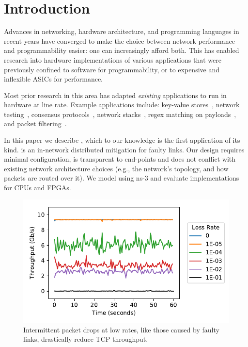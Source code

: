 \section{Introduction}
Advances in networking, hardware architecture, and programming
languages in recent years have converged to make the choice between
network performance and programmability easier: one can increasingly
afford both.
This has enabled research into hardware implementations of various
applications that were previously confined to software for
programmability, or to expensive and inflexible ASICs for performance.

Most prior research in this area has adapted \emph{existing}
applications to run in hardware at line rate.
Example applications include:
key-value stores~\cite{Li:2017:KHI:3132747.3132756},
network testing~\cite{Shahbaz:2013:AOS:2537857.2537880},
consensus protocols~\cite{Istvan:2016:CBI:2930611.2930639},
network stacks~\cite{Istvan:2016:CBI:2930611.2930639},
regex matching on payloads~\cite{Woods:2010:CED:1920841.1920926},
and packet filtering~\cite{Fiessler:2016:HVH:2881025.2881033}.

In this paper we describe \OurSys, which to our knowledge is the first application
of its kind. \OurSys is an in-network distributed
mitigation for faulty links.  
Our design requires
minimal configuration, is transparent to
end-points and does not conflict
with existing network architecture choices (e.g., the network's topology,
and how packets are routed over it). We model \OurSys using ns-3 and evaluate
implementations for CPUs and FPGAs.

\begin{figure}
  \centering
  \includegraphics[width=0.3\paperwidth]{figures/timeVsTput.pdf}
  \caption{\label{fig:timeVsTput} Intermittent packet drops at low rates, like those 
  caused by faulty links, drastically reduce TCP throughput.}
\end{figure}


